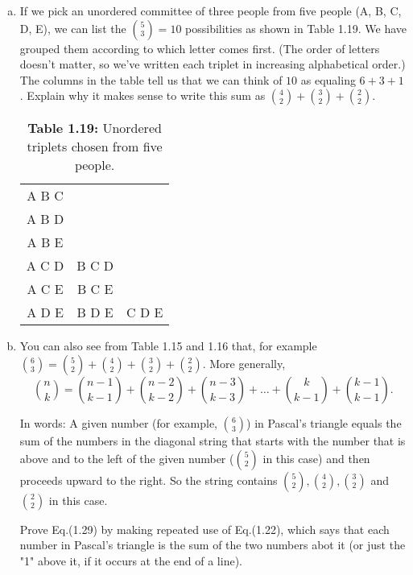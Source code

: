 \begin{enumerate}[(a)]
    \item If we pick an unordered committee of three people from five people (A, B, C, D, E),
        we can list the $\binom{5}{3} = 10$ possibilities as shown in Table 1.19.
        We have grouped them according to which letter comes first. (The order of letters
        doesn't matter, so we've written each triplet in increasing alphabetical order.)
        The columns in the table tell us that we can think of $10$ as equaling $6 + 3+ 1$.
        Explain why it makes sense to write this sum as  $\binom{4}{2} + \binom{3}{2} + \binom{2}{2}$.

        \begin{table}[h]
            \centering
            \begin{tabular}{ccc}
                A B C & & \\ 
                A B D & & \\
                A B E & & \\
                A C D & B C D & \\
                A C E & B C E & \\
                A D E & B D E & C D E \\
            \end{tabular}
            \caption*{\textbf{Table 1.19:} Unordered triplets chosen from five people.}
        \end{table}

    \item You can also see from Table 1.15 and 1.16 that, for example 
        $\binom{6}{3} = \binom{5}{2} + \binom{4}{2} + \binom{3}{2} + \binom{2}{2}$.
    More generally,
    \begin{equation*}\tag{1.29}
        \binom{n}{k} = \binom{n - 1}{k - 1} + \binom{n - 2}{k - 2} + \binom{n - 3}{k - 3} + \ldots + 
                        \binom{k}{k - 1} + \binom{k - 1}{k - 1}.
    \end{equation*}

    In words: A given number (for example, $\binom{6}{3}$) in Pascal's triangle equals the sum
    of the numbers in the diagonal string that starts with the number that is above and to the 
    left of the given number ($\binom{5}{2}$ in this case) and then proceeds upward to the right.
    So the string contains $\binom{5}{2}, \binom{4}{2}, \binom{3}{2}$ and $\binom{2}{2}$
    in this case.

    Prove Eq.(1.29) by making repeated use of Eq.(1.22), which says that each number in Pascal's
    triangle is the sum of the two numbers abot it (or just the "1" above it, if it occurs at the end 
    of a line).
\end{enumerate}


